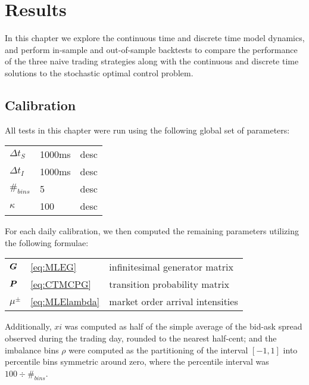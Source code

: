 \chapter{Results}

In this chapter we explore the continuous time and discrete time model dynamics, and perform in-sample and out-of-sample backtests to compare the performance of the three naive trading strategies along with the continuous and discrete time solutions to the stochastic optimal control problem.

\section{Calibration}

All tests in this chapter were run using the following global set of parameters:

\begin{tabular}{lll}
$\Delta t_S$ & 1000ms & desc \\
$\Delta t_I$ & 1000ms & desc \\
$\#_{bins}$ & 5 & desc \\
$\kappa$ & 100 & desc \\
\end{tabular}

For each daily calibration, we then computed the remaining parameters utilizing the following formulae: 

\begin{tabular}{lll}
$\boldsymbol{G}$ & \autoref{eq:MLEG} & infinitesimal generator matrix \\
$\boldsymbol{P}$ & \autoref{eq:CTMCPG} & transition probability matrix \\
$\mu^\pm$ & \autoref{eq:MLElambda} & market order arrival intensities \\
\end{tabular}

Additionally, $xi$ was computed as half of the simple average of the bid-ask spread observed during the trading day, rounded to the nearest half-cent; and the imbalance bins $\rho$ were computed as the partitioning of the interval $[-1,1]$ into percentile bins symmetric around zero, where the percentile interval was $100 \div \#_{bins}$.

